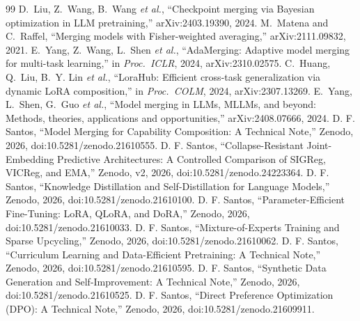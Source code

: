 \documentclass[conference]{IEEEtran}
\begin{document}
\begin{thebibliography}{99}
 D.~Liu, Z.~Wang, B.~Wang \emph{et al.}, ``Checkpoint merging via Bayesian optimization in LLM pretraining,'' arXiv:2403.19390, 2024.
 M.~Matena and C.~Raffel, ``Merging models with Fisher-weighted averaging,'' arXiv:2111.09832, 2021.
 E.~Yang, Z.~Wang, L.~Shen \emph{et al.}, ``AdaMerging: Adaptive model merging for multi-task learning,'' in \emph{Proc.\ ICLR}, 2024, arXiv:2310.02575.
 C.~Huang, Q.~Liu, B.~Y. Lin \emph{et al.}, ``LoraHub: Efficient cross-task generalization via dynamic LoRA composition,'' in \emph{Proc.\ COLM}, 2024, arXiv:2307.13269.
 E.~Yang, L.~Shen, G.~Guo \emph{et al.}, ``Model merging in LLMs, MLLMs, and beyond: Methods, theories, applications and opportunities,'' arXiv:2408.07666, 2024.
 D. F. Santos, ``Model Merging for Capability Composition: A Technical Note,'' Zenodo, 2026, doi:10.5281/zenodo.21610555.
 D. F. Santos, ``Collapse-Resistant Joint-Embedding Predictive Architectures: A Controlled Comparison of SIGReg, VICReg, and EMA,'' Zenodo, v2, 2026, doi:10.5281/zenodo.24223364.
 D. F. Santos, ``Knowledge Distillation and Self-Distillation for Language Models,'' Zenodo, 2026, doi:10.5281/zenodo.21610100.
 D. F. Santos, ``Parameter-Efficient Fine-Tuning: LoRA, QLoRA, and DoRA,'' Zenodo, 2026, doi:10.5281/zenodo.21610033.
 D. F. Santos, ``Mixture-of-Experts Training and Sparse Upcycling,'' Zenodo, 2026, doi:10.5281/zenodo.21610062.
 D. F. Santos, ``Curriculum Learning and Data-Efficient Pretraining: A Technical Note,'' Zenodo, 2026, doi:10.5281/zenodo.21610595.
 D. F. Santos, ``Synthetic Data Generation and Self-Improvement: A Technical Note,'' Zenodo, 2026, doi:10.5281/zenodo.21610525.
 D. F. Santos, ``Direct Preference Optimization (DPO): A Technical Note,'' Zenodo, 2026, doi:10.5281/zenodo.21609911.
\end{thebibliography}
\end{document}
